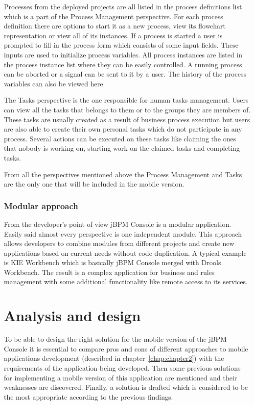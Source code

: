 \documentclass[12pt,oneside,final]{fithesis2}
\begin{document}
Processes from the deployed projects are all listed in the process definitions list which is a part of the Process Management perspective.
For each process definition there are options to start it as a new process, view its flowchart representation or view all of its instances.
If a process is started a user is prompted to fill in the process form which consists of some input fields.
These inputs are used to initialize process variables.
All process instances are listed in the process instance list where they can be easily controlled.
A running process can be aborted or a signal can be sent to it by a user.
The history of the process variables can also be viewed here.

The Tasks perspective is the one responsible for human tasks management.
Users can view all the tasks that belongs to them or to the groups they are members of.
These tasks are usually created as a result of business process execution but users are also able to create their own personal tasks which do not participate in any process.
Several actions can be executed on these tasks like claiming the ones that nobody is working on, starting work on the claimed tasks and completing tasks.

From all the perspectives mentioned above the Process Management and Tasks are the only one that will be included in the mobile version.

\subsection{Modular approach}

From the developer's point of view jBPM Console is a modular application.
Easily said almost every perspective is one independent module.
This approach allows developers to combine modules from different projects and create new applications based on current needs without code duplication.
A typical example is KIE Workbench which is basically jBPM Console merged with Drools Workbench.
The result is a complex application for business and rules management with some additional functionality like remote access to its services.



\chapter{Analysis and design}
To be able to design the right solution for the mobile version of the jBPM Console it is essential to compare pros and cons of different approaches to mobile applications development (described in chapter~\ref{chap:chapter2}) with the requirements of the application being developed.
Then some previous solutions for implementing a mobile version of this application are mentioned and their weaknesses are discovered.
Finally, a solution is drafted which is considered to be the most appropriate according to the previous findings.
\end{document}
